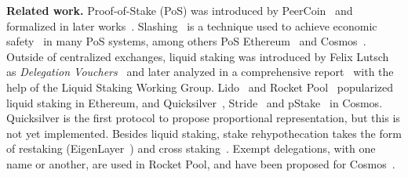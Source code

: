 \noindent
\textbf{Related work.}
Proof-of-Stake (PoS) was introduced by PeerCoin~\cite{peercoin} and formalized
in later works~\cite{ouroboros,praos,ouroboros-genesis,algorand,DBLP:journals/iacr/BentovPS16a}.
Slashing~\cite{slashing} is a technique used to achieve economic safety~\cite{slashable-safety}
in many PoS systems, among others
PoS Ethereum~\cite{casper,buterin2020combining}
and Cosmos~\cite{2018tendermint,buchman2016tendermint,cosmossdk}.
Outside of centralized exchanges, liquid staking was introduced by Felix Lutsch
as \emph{Delegation Vouchers}~\cite{delegation-vouchers}
and later analyzed in a comprehensive report~\cite{liquid-staking-report} with
the help of the Liquid Staking Working Group.
Lido~\cite{lido} and Rocket Pool~\cite{rocket-pool} popularized liquid staking
in Ethereum, and Quicksilver~\cite{quicksilver}, Stride~\cite{stride} and
pStake~\cite{pstake} in Cosmos. Quicksilver is the first protocol to propose proportional
representation, but this is not yet implemented.
Besides liquid staking, stake rehypothecation takes the form of
restaking (EigenLayer~\cite{eigenlayer}) and cross staking~\cite{mesh-security}.
Exempt delegations, with one name or another, are used in Rocket Pool,
and have been proposed for Cosmos~\cite{adr-liquid-staking}.
